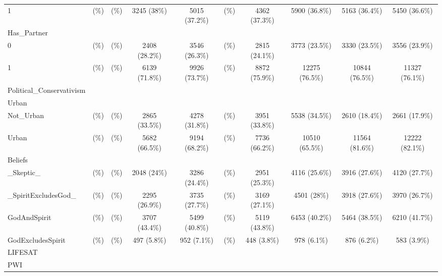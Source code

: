 \documentclass[
  english,
  man,floatsintext]{apa6}
\begin{document}
\begin{table}[ ht ]
{\begin{tabular}{ l c c c c c c c c c }
\hspace{6pt}    1 &  (\%) &  (\%) & 3245 (38\%) & 5015 (37.2\%) &  (\%) & 4362 (37.3\%) & 5900 (36.8\%) & 5163 (36.4\%) & 5450 (36.6\%)\\ 
Has\_Partner &   &   &   &   &   &   &   &   &  \\ 
\hspace{6pt}    0 &  (\%) &  (\%) & 2408 (28.2\%) & 3546 (26.3\%) &  (\%) & 2815 (24.1\%) & 3773 (23.5\%) & 3330 (23.5\%) & 3556 (23.9\%)\\ 
\hspace{6pt}    1 &  (\%) &  (\%) & 6139 (71.8\%) & 9926 (73.7\%) &  (\%) & 8872 (75.9\%) & 12275 (76.5\%) & 10844 (76.5\%) & 11327 (76.1\%)\\ 
Political\_Conservativism &   &   &   &   &   &   &   &   &  \\ 
Urban &   &   &   &   &   &   &   &   &  \\ 
\hspace{6pt}    Not\_Urban &  (\%) &  (\%) & 2865 (33.5\%) & 4278 (31.8\%) &  (\%) & 3951 (33.8\%) & 5538 (34.5\%) & 2610 (18.4\%) & 2661 (17.9\%)\\ 
\hspace{6pt}    Urban &  (\%) &  (\%) & 5682 (66.5\%) & 9194 (68.2\%) &  (\%) & 7736 (66.2\%) & 10510 (65.5\%) & 11564 (81.6\%) & 12222 (82.1\%)\\ 
Beliefs &   &   &   &   &   &   &   &   &  \\ 
\hspace{6pt}    \_Skeptic\_ &  (\%) &  (\%) & 2048 (24\%) & 3286 (24.4\%) &  (\%) & 2951 (25.3\%) & 4116 (25.6\%) & 3916 (27.6\%) & 4120 (27.7\%)\\ 
\hspace{6pt}    \_SpiritExcludesGod\_ &  (\%) &  (\%) & 2295 (26.9\%) & 3735 (27.7\%) &  (\%) & 3169 (27.1\%) & 4501 (28\%) & 3918 (27.6\%) & 3970 (26.7\%)\\ 
\hspace{6pt}    GodAndSpirit &  (\%) &  (\%) & 3707 (43.4\%) & 5499 (40.8\%) &  (\%) & 5119 (43.8\%) & 6453 (40.2\%) & 5464 (38.5\%) & 6210 (41.7\%)\\ 
\hspace{6pt}    GodExcludesSpirit &  (\%) &  (\%) & 497 (5.8\%) & 952 (7.1\%) &  (\%) & 448 (3.8\%) & 978 (6.1\%) & 876 (6.2\%) & 583 (3.9\%)\\ 
LIFESAT &   &   &   &   &   &   &   &   &  \\ 
PWI &   &   &   &   &   &   &   &   &  \\ 
\bottomrule

\end{tabular}
}
\end{table}
\end{document}
